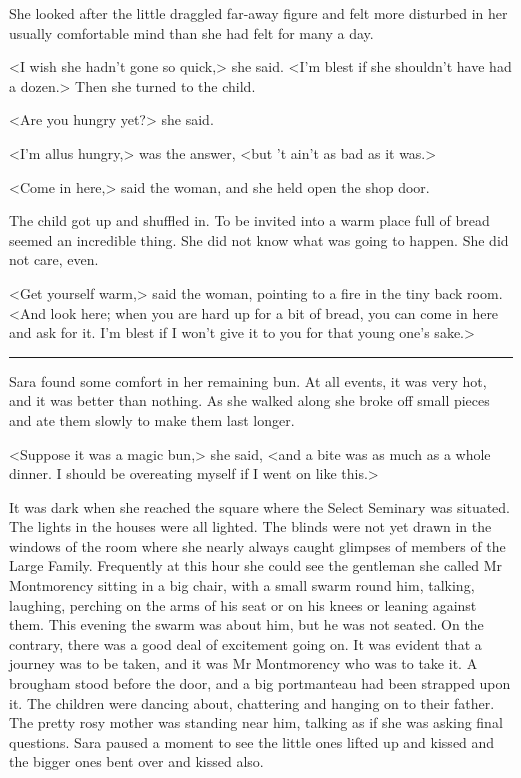 She looked after the little draggled far-away figure and felt more disturbed in her usually comfortable mind than she had felt for many a day.

<I wish she hadn't gone so quick,> she said. <I'm blest if she shouldn't have had a dozen.> Then she turned to the child.

<Are you hungry yet?> she said.

<I'm allus hungry,> was the answer, <but 't ain't as bad as it was.>

<Come in here,> said the woman, and she held open the shop door.

The child got up and shuffled in. To be invited into a warm place full of bread seemed an incredible thing. She did not know what was going to happen. She did not care, even.

<Get yourself warm,> said the woman, pointing to a fire in the tiny back room. <And look here; when you are hard up for a bit of bread, you can come in here and ask for it. I'm blest if I won't give it to you for that young one's sake.>

\noindent\hfil\rule{0.5\textwidth}{.4pt}\hfil 

Sara found some comfort in her remaining bun. At all events, it was very hot, and it was better than nothing. As she walked along she broke off small pieces and ate them slowly to make them last longer.

<Suppose it was a magic bun,> she said, <and a bite was as much as a whole dinner. I should be overeating myself if I went on like this.>

It was dark when she reached the square where the Select Seminary was situated. The lights in the houses were all lighted. The blinds were not yet drawn in the windows of the room where she nearly always caught glimpses of members of the Large Family. Frequently at this hour she could see the gentleman she called Mr Montmorency sitting in a big chair, with a small swarm round him, talking, laughing, perching on the arms of his seat or on his knees or leaning against them. This evening the swarm was about him, but he was not seated. On the contrary, there was a good deal of excitement going on. It was evident that a journey was to be taken, and it was Mr Montmorency who was to take it. A brougham stood before the door, and a big portmanteau had been strapped upon it. The children were dancing about, chattering and hanging on to their father. The pretty rosy mother was standing near him, talking as if she was asking final questions. Sara paused a moment to see the little ones lifted up and kissed and the bigger ones bent over and kissed also.

